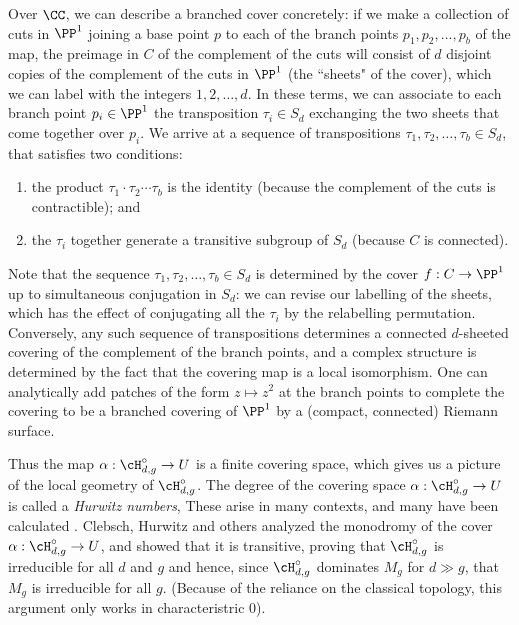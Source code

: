 Over $\CC$, we can describe a branched cover concretely: if we make a collection of cuts in $\PP^1$ joining a base point $p$ to each of the branch points $p_1, p_2, \dots, p_b$ of the map, the preimage in $C$ of the complement of the cuts will consist of $d$ disjoint copies of the complement of the cuts in $\PP^1$ (the ``sheets" of the cover), which we can label with the integers $1, 2, \dots, d$. In these terms, we can associate to each branch point $p_i \in \PP^1$ the transposition $\tau_i \in S_d$ exchanging the two sheets that come together over $p_i$. We arrive at a sequence of transpositions $\tau_1, \tau_2, \dots, \tau_b \in S_d$, that satisfies two conditions:

\begin{enumerate}
\item the product $\tau_1\cdot \tau_2 \cdots \tau_b$ is the identity (because the complement of the cuts is contractible); and
\item the $\tau_i$ together generate a transitive subgroup of $S_d$ (because $C$ is connected).
\end{enumerate}

Note that the sequence $\tau_1, \tau_2, \dots, \tau_b \in S_d$ is determined by the cover $f : C \to \PP^1$ up to simultaneous conjugation in $S_d$: we can revise our labelling of the sheets, which has the effect of conjugating all the $\tau_i$ by the relabelling permutation. Conversely, any such sequence of transpositions determines a connected $d$-sheeted covering of the complement
of the branch points, and a complex structure is determined by the fact that the covering map is a local isomorphism. One can analytically add patches of the form $z \mapsto z^2$ at the branch points to complete
the covering to be a branched covering of $\PP^1$ by a (compact, connected) Riemann surface. 

Thus the map $\alpha : \cH^\circ_{d,g} \to U$ is a finite covering space, which gives us a picture of the local geometry of $\cH^\circ_{d,g}$. 
The degree of the covering space $\alpha : \cH^\circ_{d,g} \to U$ is called a \emph{Hurwitz numbers}, These arise in many contexts, and many have been calculated \cite{Graber-Vakil}. Clebsch, Hurwitz and others analyzed the monodromy of the cover $\alpha : \cH^\circ_{d,g} \to U$, and showed that it is transitive, proving that $\cH^\circ_{d,g}$ is irreducible for all $d$ and $g$ and hence, since $\cH^\circ_{d,g}$ dominates $M_g$ for $d \gg g$, that $M_g$ is irreducible for all $g$. (Because of the reliance on the classical topology, this argument only works in characteristric 0). 

